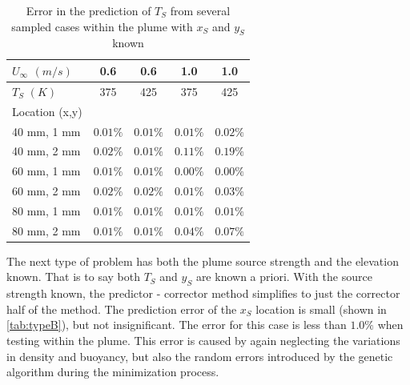 \documentclass[preprint,12pt]{elsarticle}
\begin{document}
\begin{table}[!h!t!b!p]
\begin{center}
\begin{tabular}{ l | c c c c}
 $U_{\infty}$ $(m/s)$ & 0.6 & 0.6 & 1.0 & 1.0 \\ \hline
 $T_S$ $(K)$ & 375 & 425 & 375 & 425  \\ \hline \hline
 Location (x,y) & \\
 40 mm, 1 mm & $0.01\%$ & $0.01\%$ & $0.01\%$ & $0.02\%$ \\ \hline
 40 mm, 2 mm & $0.02\%$ & $0.01\%$ & $0.11\%$ & $0.19\%$ \\ \hline
 60 mm, 1 mm & $0.01\%$ & $0.01\%$ & $0.00\%$ & $0.00\%$ \\ \hline
 60 mm, 2 mm & $0.02\%$ & $0.02\%$ & $0.01\%$ & $0.03\%$ \\ \hline
 80 mm, 1 mm & $0.01\%$ & $0.01\%$ & $0.01\%$ & $0.01\%$ \\ \hline
 80 mm, 2 mm & $0.01\%$ & $0.01\%$ & $0.04\%$ & $0.07\%$ \\ \hline
 \end{tabular}
\caption{Error in the prediction of $T_S$ from several sampled cases within the plume with $x_S$ and $y_S$ known}
\label{tab:typeA}
\end{center}
\end{table}

The next type of problem has both the plume source strength and the elevation known.  That is to say both $T_S$ and $y_S$ are known a priori.  With the source strength known, the predictor - corrector method simplifies to just the corrector half of the method.  The prediction error of the $x_S$ location is small (shown in \cref{tab:typeB}), but not insignificant.  The error for this case is less than $1.0\%$ when testing within the plume.  This error is caused by again neglecting the variations in density and buoyancy, but also the random errors introduced by the genetic algorithm during the minimization process.
\end{document}
